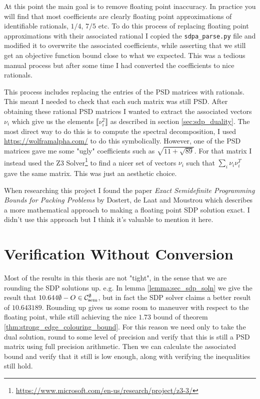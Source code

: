 At this point the main goal is to remove floating point inaccuracy. In practice you
will find that most coefficients are clearly floating point approximations of identifiable
rationals, $1/4$, $7/5$ etc. To do this process of replacing floating point approximations with
their associated rational I copied the \verb|sdpa_parse.py| file and modified it to
overwrite the associated coefficients, while asserting that we still get an
objective function bound close to what we expected.
This was a tedious manual process but after some time I had converted the coefficients to
nice rationals.

This process includes replacing the entries of the PSD matrices with rationals. This meant
I needed to check that each such matrix was still PSD. After obtaining these rational
PSD matrices I wanted to extract the associated vectors $\nu_i$ which give us the
elements $\llbracket \nu_i^2 \rrbracket$ as described in section \ref{sec:sdp_duality}.
The most direct way to do this is to compute the spectral decomposition, I used
\url{https://wolframalpha.com/} to do this symbolically. However, one of the PSD matrices
gave me some "ugly" coefficients such as $\sqrt{11 + \sqrt{89}}$. For that matrix
I instead used the Z3 Solver\footnote{\url{https://www.microsoft.com/en-us/research/project/z3-3/}}
to find a nicer set of vectors $\nu_i$ such that $\sum_i \nu_i\nu_i^T$ gave the same
matrix. This was just an aesthetic choice.

\begin{note*}
    When researching this project I found the paper
    \textit{Exact Semidefinite Programming Bounds for Packing Problems} by
    Dostert, de Laat and Moustrou \cite{dostertExactSemidefiniteProgramming2021}
    which describes a more mathematical approach to making a floating point SDP solution
    exact. I didn't use this approach but I think it's valuable to mention it here.
\end{note*}

\section*{Verification Without Conversion}

Most of the results in this thesis are not "tight", in the sense that we are rounding
the SDP solutions up. e.g. In lemma \ref{lemma:sec_sdp_soln} we give the result that
$10.644\emptyset - O \in\mathcal{C}_\mathrm{sem}^\emptyset$, but in fact the SDP solver claims a
better result of $10.643189$. Rounding up gives us some room to maneuver with respect
to the floating point, while still achieving the nice $1.73$ bound of theorem
\ref{thm:strong_edge_colouring_bound}. For this reason we need only to take the
dual solution, round to some level of precision and verify that this is still a PSD matrix
using full precision arithmetic.
Then we can calculate the associated bound and verify that it still is low enough, along
with verifying the inequalities still hold.
